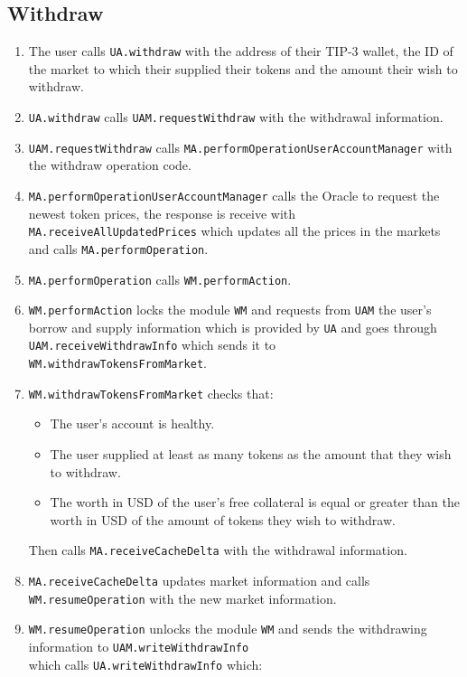\subsection{Withdraw}
\begin{enumerate}
  \item The user calls \verb|UA.withdraw| with the address of their TIP-3 wallet, the ID of the market to which their supplied their tokens and the amount their wish to withdraw.
  \item \verb|UA.withdraw| calls \verb|UAM.requestWithdraw| with the withdrawal information.
  \item \verb|UAM.requestWithdraw| calls \verb|MA.performOperationUserAccountManager| with the withdraw operation code.
  \item \verb|MA.performOperationUserAccountManager| calls the Oracle to request the newest token prices, the response is receive with \\\verb|MA.receiveAllUpdatedPrices| which updates all the prices in the markets and calls \verb|MA.performOperation|.
  \item \verb|MA.performOperation| calls \verb|WM.performAction|.
  \item \verb|WM.performAction| locks the module \verb|WM| and requests from \verb|UAM| the user's borrow and supply information which is provided by \verb|UA| and goes through \verb|UAM.receiveWithdrawInfo| which sends it to \\\verb|WM.withdrawTokensFromMarket|.
  \item \verb|WM.withdrawTokensFromMarket| checks that:
  \begin{itemize}
    \item The user's account is healthy.
    \item The user supplied at least as many tokens as the amount that they wish to withdraw.
    \item The worth in USD of the user's free collateral is equal or greater than the worth in USD of the amount of tokens they wish to withdraw.
  \end{itemize}
  Then calls \verb|MA.receiveCacheDelta| with the withdrawal information.
  \item \verb|MA.receiveCacheDelta| updates market information and calls \\\verb|WM.resumeOperation| with the new market information.
  \item \verb|WM.resumeOperation| unlocks the module \verb|WM| and sends the withdrawing information to \verb|UAM.writeWithdrawInfo| \\which calls \verb|UA.writeWithdrawInfo| which:

\end{enumerate}
